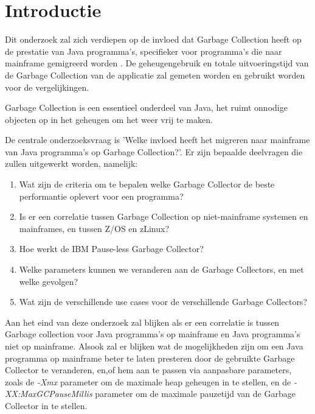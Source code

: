 
\section{Introductie}%
\label{sec:introductie}
Dit onderzoek zal zich verdiepen op de invloed dat Garbage Collection heeft op de prestatie van Java programma's, specifieker voor programma's die naar mainframe gemigreerd worden .
De geheugengebruik en totale uitvoeringstijd van de Garbage Collection van de applicatie zal gemeten worden en gebruikt worden voor de vergelijkingen.

Garbage Collection is een essentieel onderdeel van Java, het ruimt onnodige objecten op in het geheugen om het weer vrij te maken.

De centrale onderzoeksvraag is 'Welke invloed heeft het migreren naar mainframe van Java programma's op Garbage Collection?'.
Er zijn bepaalde deelvragen die zullen uitgewerkt worden, namelijk:

\begin{enumerate}
    \item Wat zijn de criteria om te bepalen welke Garbage Collector de beste performantie oplevert voor een programma? 
    \item Is er een correlatie tussen Garbage Collection op niet-mainframe systemen en mainframes, en tussen Z/OS en zLinux?
    \item Hoe werkt de IBM Pause-less Garbage Collector? 
    \item Welke parameters kunnen we veranderen aan de Garbage Collectors, en met welke gevolgen? 
    \item Wat zijn de verschillende use cases voor de verschillende Garbage Collectors?  
\end{enumerate}

Aan het eind van deze onderzoek zal blijken als er een correlatie is tussen Garbage collection voor Java programma's op mainframe en Java programma's niet op mainframe.
Alsook zal er blijken wat de mogelijkheden zijn om een Java programma op mainframe beter te laten presteren door de gebruikte Garbage Collector te veranderen, en,of hem aan te passen via aanpasbare parameters, zoals de \textit{-Xmx} parameter om de maximale heap geheugen in te stellen, en de \textit{-XX:MaxGCPauseMillis} parameter om de maximale pauzetijd van de Garbage Collector in te stellen.


